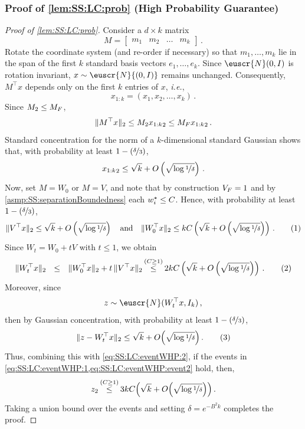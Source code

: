 \documentclass[11pt,letterpaper]{article}
\theoremstyle{plain}
\theoremstyle{definition}
\theoremstyle{remark}
\newcommand{\yesnum}{\addtocounter{equation}{1}\tag{\theequation}}
\newcommand{\Stackrel}[2]{\stackrel{\mathmakebox[\widthof{\ensuremath{#2}}]{#1}}{#2}}
\newcommand{\quadtext}[1]{\quad\text{#1}\quad}
\newcommand{\quadand}{\quadtext{and}}
\newcommand{\inparen}[1]{\ensuremath{\left(#1\right)}}
\newcommand{\snorm}[1]{\ensuremath{\ensuremath{\| #1 \|}}}
\let\norm\relax
\newcommand{\norm}[1]{\ensuremath{\left\lVert #1 \right\rVert}}
\newcommand{\nfrac}[2]{\nicefrac{#1}{#2}}
\newcommand{\customcal}[1]{\euscr{#1}}
\newcommand{\cN}{\customcal{N}}
\newcommand{\ie}{\emph{i.e.}}
\newcommand{\normal}[2]{\cN{\inparen{#1,#2}}}
\begin{document}
{{\subsubsection{Proof of \cref{lem:SS:LC:prob} (High Probability Guarantee)}
    \label{sec:proofof:lem:SS:LC:prob}
    \begin{proof}[Proof of \cref{lem:SS:LC:prob}]
        Consider a $d\times k$ matrix 
        \[
        M=\begin{bmatrix} m_1 & m_2 & \dots & m_k \end{bmatrix}\,.
        \]
        Rotate the coordinate system (and re-order if necessary) so that $m_1,\dots,m_k$ lie in the span of the first $k$ standard basis vectors $e_1,\dots,e_k$. 
        Since $\cN(0,I)$ is rotation invariant, $x\sim\normal{0}{I}$ remains unchanged. 
        Consequently, $M^\top x$ depends only on the first $k$ entries of $x$, \ie{}, 
        \[
        x_{1:k}=\inparen{x_1,x_2,\dots,x_k}\,.
        \] 
        Since $\norm{M}_2\leq \norm{M}_F$,
        \[
            \snorm{M^\top x}_2
            \leq  \norm{M}_2\norm{x_{1:k}}_2
            \leq  \norm{M}_F\norm{x_{1:k}}_2\,.
        \]
        Standard concentration for the norm of a $k$-dimensional standard Gaussian shows that, with probability at least $1-(\nfrac{\delta}{3})$,
        \[
        \norm{x_{1:k}}_2 \le \sqrt{k} + O\inparen{\sqrt{\log\nfrac{1}{\delta}}}\,.
        \]
        Now, set $M=W_0$ or $M=V$, and note that by construction $\norm{V}_F=1$ and by \cref{asmp:SS:separationBoundedness} each $\norm{w_i^\star}\le C$. Hence, with probability at least $1-(\nfrac{\delta}{3})$,
        \begin{align*}
            \snorm{V^\top x}_2 \le \sqrt{k} + O\inparen{\sqrt{\log\nfrac{1}{\delta}}}
                \quadand
            \snorm{W_0^\top x}_2 \le kC\inparen{\sqrt{k} + O\inparen{\sqrt{\log\nfrac{1}{\delta}}}}\,.
        \yesnum\label{eq:SS:LC:eventWHP:1}
        \end{align*}
        Since $W_t=W_0+tV$ with $t\le 1$, we obtain
        \[
            \snorm{W_t^\top x}_2 
            ~~\le~~ \snorm{W_0^\top x}_2 + t\,\snorm{V^\top x}_2 
            ~~\Stackrel{(C\geq 1)}{\le}~~ 
                2kC\inparen{\sqrt{k} + O\inparen{\sqrt{\log\nfrac{1}{\delta}}}}\,.
        \yesnum\label{eq:SS:LC:eventWHP:2}
        \]
        Moreover, since 
        \[
        z\sim \cN(W_t^\top x, I_{k})\,,
        \]
        then by Gaussian concentration, with probability at least $1-(\nfrac{\delta}{3})$,
        \[
            \snorm{z-W_t^\top x}_2 \le \sqrt{k} + O\Bigl(\sqrt{\log\nfrac{1}{\delta}}\Bigr)\,.
            \yesnum\label{eq:SS:LC:eventWHP:event2}
        \]
        Thus, combining this with \cref{eq:SS:LC:eventWHP:2}, if the events in \cref{eq:SS:LC:eventWHP:1,eq:SS:LC:eventWHP:event2} hold, then, 
        \[
        \norm{z}_2 
            ~~\Stackrel{(C\geq 1)}{\le}~~ 3kC\Bigl(\sqrt{k} + O\Bigl(\sqrt{\log\nfrac{1}{\delta}}\Bigr)\Bigr)\,.
        \]
        Taking a union bound over the events and setting $\delta=e^{-B^2k}$ completes the proof. 
    \end{proof} 




}}
\end{document}

